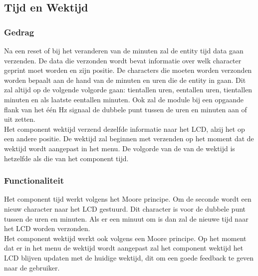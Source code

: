 \subsection{Tijd en Wektijd}

\subsubsection{Gedrag}
Na een reset of bij het veranderen van de minuten zal de entity tijd data gaan verzenden. De data die verzonden wordt bevat informatie over welk character geprint moet worden en zijn positie. De characters die moeten worden verzonden worden bepaalt aan de hand van de minuten en uren die de entity in gaan. Dit zal altijd op de volgende volgorde gaan: tientallen uren, eentallen uren, tientallen minuten en als laatste eentallen minuten. Ook zal de module bij een opgaande flank van het \'e\'en Hz signaal de dubbele punt tussen de uren en minuten aan of uit zetten.\\
Het component wektijd verzend dezelfde informatie naar het LCD, alzij het op een andere positie. De wektijd zal beginnen met verzenden op het moment dat de wektijd wordt aangepast in het menu. De volgorde van de van de wektijd is hetzelfde als die van het component tijd.

\subsubsection{Functionaliteit}
Het component tijd werkt volgens het Moore principe. Om de seconde wordt een nieuw character naar het LCD gestuurd. Dit character is voor de dubbele punt tussen de uren en minuten. Als er een minuut om is dan zal de nieuwe tijd naar het LCD worden verzonden.\\
Het component wektijd werkt ook volgens een Moore principe. Op het moment dat er in het menu de wektijd wordt aangepast zal het component wektijd het LCD blijven updaten met de huidige wektijd, dit om een goede feedback te geven naar de gebruiker.

